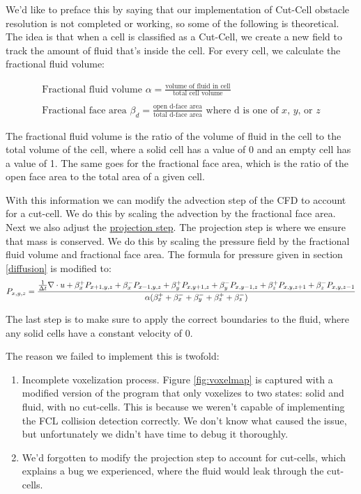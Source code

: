 \documentclass[a4paper,12pt,titlepage]{article}
\begin{document}
We'd like to preface this by saying that our implementation of Cut-Cell obstacle
resolution is not completed or working, so some of the following is theoretical.
The idea is that when a cell is classified as a Cut-Cell, we create a new field to
track the amount of fluid that's inside the cell. For every cell, we calculate the
fractional fluid volume:

\[
	\begin{array}{ll}
		\text{Fractional fluid volume } \alpha = \frac{\text{volume of fluid in cell}}{\text{total cell volume}} \\
		\\
		\text{Fractional face area } \beta_d = \frac{\text{open d-face area}}{\text{total d-face area}} \text{ where d is one of $x$, $y$, or $z$}
	\end{array}
\]

The fractional fluid volume is the ratio of the volume of fluid in the cell to the
total volume of the cell, where a solid cell has a value of 0 and an empty cell has
a value of 1. The same goes for the fractional face area, which is the ratio of the
open face area to the total area of a given cell.

With this information we can modify the advection step of the CFD to account for
a cut-cell. We do this by scaling the advection by the fractional face area. Next
we also adjust the \hyperref[projectionstep]{projection step}. The projection step
is where we ensure that mass is conserved. We do this by scaling the pressure
field by the fractional fluid volume and fractional face area. The formula for pressure
given in section \ref{diffusion} is modified to:
\[
	\centering
	P_{x, y, z} = \frac{
		\frac{1}{\Delta t} \nabla \cdot u + \beta_x^+ P_{x+1, y, z} + \beta_x^- P_{x-1, y, z} + \beta_y^+ P_{x, y+1, z} + \beta_y^- P_{x, y-1, z} + \beta_z^+ P_{x, y, z+1} + \beta_z^- P_{x, y, z-1}
	}{
		\alpha (\beta_x^+ + \beta_x^- + \beta_y^- + \beta_z^+ + \beta_z^-)
	}
\]

The last step is to make sure to apply the correct boundaries to the fluid,
where any solid cells have a constant velocity of 0.

The reason we failed to implement this is twofold:
\begin{enumerate}
	\item{
			Incomplete voxelization process. Figure \ref{fig:voxelmap} is
			captured with a modified version of the program that only voxelizes
			to two states: solid and fluid, with no cut-cells. This is because we
			weren't capable of implementing the FCL collision detection correctly.
			We don't know what caused the issue, but unfortunately we didn't have
			time to debug it thoroughly.
		}
	\item{
			We'd forgotten to modify the projection step to account for cut-cells,
			which explains a bug we experienced, where the fluid would leak through
			the cut-cells.
		}
\end{enumerate}
\end{document}
